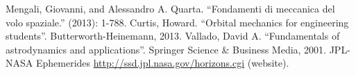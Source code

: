 \begin{thebibliography}{99} 
Mengali, Giovanni, and Alessandro A. Quarta. ``Fondamenti di meccanica del volo spaziale.'' (2013): 1-788.
Curtis, Howard. ``Orbital mechanics for engineering students''. Butterworth-Heinemann, 2013.
Vallado, David A. ``Fundamentals of astrodynamics and applications''. Springer Science \& Business Media, 2001.
JPL-NASA Ephemerides \url{http://ssd.jpl.nasa.gov/horizons.cgi} (website).
\end{thebibliography}